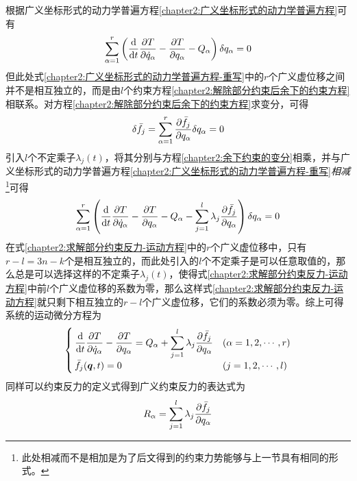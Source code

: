 根据广义坐标形式的动力学普遍方程\eqref{chapter2:广义坐标形式的动力学普遍方程}可有
\begin{equation}
	\sum_{\alpha=1}^r \left(\dfrac{\mathrm{d}}{\mathrm{d} t}\frac{\partial T}{\partial \dot{q}_\alpha} - \frac{\partial T}{\partial q_\alpha} - Q_\alpha\right)\delta q_\alpha = 0
	\label{chapter2:广义坐标形式的动力学普遍方程-重写}
\end{equation}
但此处式\eqref{chapter2:广义坐标形式的动力学普遍方程-重写}中的$r$个广义虚位移之间并不是相互独立的，而是由$l$个约束方程\eqref{chapter2:解除部分约束后余下的约束方程}相联系。对方程\eqref{chapter2:解除部分约束后余下的约束方程}求变分，可得
\begin{equation}
	\delta \bar{f}_j = \sum_{\alpha=1}^r \frac{\partial \bar{f}_j}{\partial q_\alpha} \delta q_\alpha = 0
	\label{chapter2:余下约束的变分}
\end{equation}
引入$l$个不定乘子$\lambda_j(t)$，将其分别与方程\eqref{chapter2:余下约束的变分}相乘，并与广义坐标形式的动力学普遍方程\eqref{chapter2:广义坐标形式的动力学普遍方程-重写}{\it 相减}\footnote{此处相减而不是相加是为了后文得到的约束力势能够与上一节具有相同的形式。}可得
\begin{equation}
	\sum_{\alpha=1}^r \left(\frac{\mathrm{d}}{\mathrm{d} t} \frac{\partial T}{\partial \dot{q}_\alpha} - \frac{\partial T}{\partial q_\alpha} - Q_\alpha - \sum_{j=1}^l \lambda_j \frac{\partial \bar{f}_j}{\partial q_\alpha} \right) \delta q_\alpha = 0
	\label{chapter2:求解部分约束反力-运动方程}
\end{equation}
在式\eqref{chapter2:求解部分约束反力-运动方程}中的$r$个广义虚位移中，只有$r-l=3n-k$个是相互独立的，而此处引入的$l$个不定乘子是可以任意取值的，那么总是可以选择这样的不定乘子$\lambda_j(t)$，使得式\eqref{chapter2:求解部分约束反力-运动方程}中前$l$个广义虚位移的系数为零，那么这样式\eqref{chapter2:求解部分约束反力-运动方程}就只剩下相互独立的$r-l$个广义虚位移，它们的系数必须为零。综上可得系统的运动微分方程为
\begin{equation}
\begin{cases}
	\displaystyle \frac{\mathrm{d}}{\mathrm{d} t} \frac{\partial T}{\partial \dot{q}_\alpha} - \frac{\partial T}{\partial q_\alpha} = Q_\alpha + \sum_{j=1}^l \lambda_j \frac{\partial \bar{f}_j}{\partial q_\alpha} & (\alpha=1,2,\cdots,r) \\
	\bar{f}_j(\boldsymbol{q},t) = 0 & (j=1,2,\cdots,l)
\end{cases}
\label{chapter2:求解理想完整系统的部分约束反力}
\end{equation}
同样可以约束反力的定义式得到广义约束反力的表达式为
\begin{equation}
	R_\alpha = \sum_{j=1}^l \lambda_j \frac{\partial \bar{f}_j}{\partial q_\alpha}
\end{equation}
